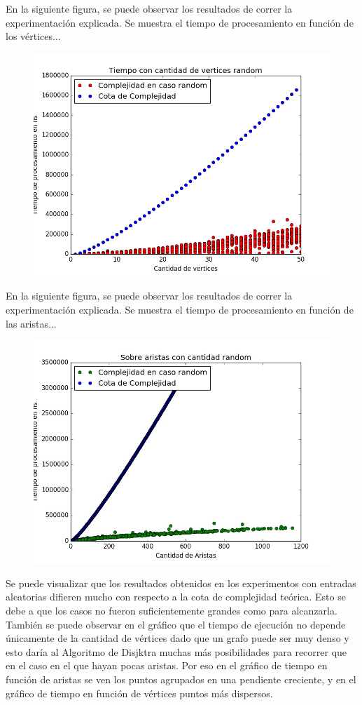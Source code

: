         En la siguiente figura, se puede observar los resultados de correr la experimentación explicada. Se muestra el tiempo de procesamiento en función de los vértices...

        \begin{figure}[H]
          \begin{center}
            \includegraphics[width=0.7\columnwidth]{../exp/ej3casosRandomVertices.png}
            \caption{}
          \end{center}
        \end{figure}

        En la siguiente figura, se puede observar los resultados de correr la experimentación explicada. Se muestra el tiempo de procesamiento en función de las aristas...

        \begin{figure}[H]
          \begin{center}
            \includegraphics[width=0.7\columnwidth]{../exp/ej3casosRandomAristas.jpeg}
            \caption{}
          \end{center}
        \end{figure}

        Se puede visualizar que los resultados obtenidos en los experimentos con entradas aleatorias difieren mucho con respecto a la cota de complejidad teórica. Esto se debe a que los casos no fueron suficientemente grandes como para alcanzarla. 
        También se puede observar en el gráfico que el tiempo de ejecución no depende únicamente de la cantidad de vértices dado que un grafo puede ser muy denso y esto daría al Algoritmo de Disjktra muchas más posibilidades para recorrer que en el caso en el que hayan pocas aristas. Por eso en el gráfico de tiempo en función de aristas se ven los puntos agrupados en una pendiente creciente, y en el gráfico de tiempo en función de vértices puntos más dispersos.

